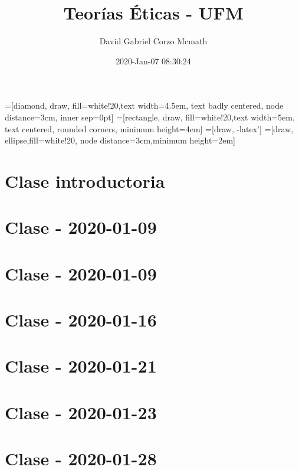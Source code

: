 \documentclass{book}
\title{Teorías Éticas - UFM}
\author{David Gabriel Corzo Mcmath}
\date{2020-Jan-07 08:30:24}
\begin{document}
\maketitle
\tableofcontents

=[diamond, draw, fill=white!20,text width=4.5em, text badly centered, node distance=3cm, inner sep=0pt]
=[rectangle, draw, fill=white!20,text width=5em, text centered, rounded corners, minimum height=4em]
=[draw, -latex']
=[draw, ellipse,fill=white!20, node distance=3cm,minimum height=2em]


\chapter{Clase introductoria}


\chapter{Clase - 2020-01-09}


\chapter{Clase - 2020-01-09}


\chapter{Clase - 2020-01-16}


\chapter{Clase - 2020-01-21}


\chapter{Clase - 2020-01-23}


\chapter{Clase - 2020-01-28}

\end{document}
